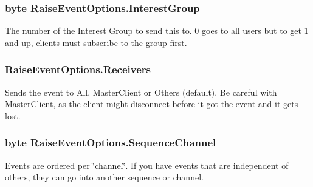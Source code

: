 \subsubsection[{\texorpdfstring{Interest\+Group}{InterestGroup}}]{\setlength{\rightskip}{0pt plus 5cm}byte Raise\+Event\+Options.\+Interest\+Group}\hypertarget{class_raise_event_options_ab9fdfe47e82d2d049a347e7df4cef701}{}\label{class_raise_event_options_ab9fdfe47e82d2d049a347e7df4cef701}


The number of the Interest Group to send this to. 0 goes to all users but to get 1 and up, clients must subscribe to the group first.

\subsubsection[{\texorpdfstring{Receivers}{Receivers}}]{ Raise\+Event\+Options.\+Receivers}\hypertarget{class_raise_event_options_a0df0c168fd813e5041f1b0afc6826a75}{}\label{class_raise_event_options_a0df0c168fd813e5041f1b0afc6826a75}


Sends the event to All, Master\+Client or Others (default). Be careful with Master\+Client, as the client might disconnect before it got the event and it gets lost.

\subsubsection[{\texorpdfstring{Sequence\+Channel}{SequenceChannel}}]{\setlength{\rightskip}{0pt plus 5cm}byte Raise\+Event\+Options.\+Sequence\+Channel}\hypertarget{class_raise_event_options_a3fff0d28599564c9d69c147ea39682d6}{}\label{class_raise_event_options_a3fff0d28599564c9d69c147ea39682d6}


Events are ordered per \char`\"{}channel\char`\"{}. If you have events that are independent of others, they can go into another sequence or channel.

